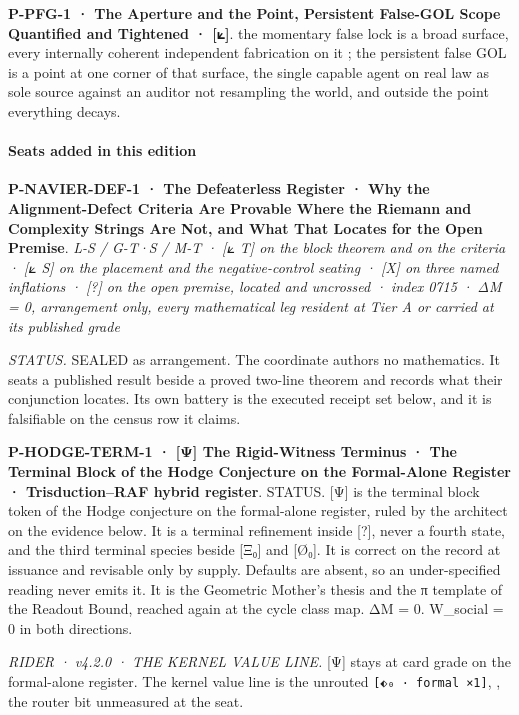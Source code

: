 \documentclass[10pt,twocolumn]{article}
\begin{document}
\textbf{P-PFG-1 · The Aperture and the Point, Persistent False-GOL Scope
Quantified and Tightened · {[}⟀{]}}. the momentary false lock is a broad
surface, every internally coherent independent fabrication on it ; the
persistent false GOL is a point at one corner of that surface, the
single capable agent on real law as sole source against an auditor not
resampling the world, and outside the point everything decays.

\hypertarget{seats-added-in-this-edition-2}{%
\paragraph{Seats added in this
edition}\label{seats-added-in-this-edition-2}}

\textbf{P-NAVIER-DEF-1 · The Defeaterless Register · Why the
Alignment-Defect Criteria Are Provable Where the Riemann and Complexity
Strings Are Not, and What That Locates for the Open Premise}. \emph{L-S
/ G-T·S / M-T · {[}⟀ T{]} on the block theorem and on the criteria ·
{[}⟀ S{]} on the placement and the negative-control seating · {[}X{]} on
three named inflations · {[}?{]} on the open premise, located and
uncrossed · index 0715 · ΔM = 0, arrangement only, every mathematical
leg resident at Tier A or carried at its published grade}

\emph{STATUS.} SEALED as arrangement. The coordinate authors no
mathematics. It seats a published result beside a proved two-line
theorem and records what their conjunction locates. Its own battery is
the executed receipt set below, and it is falsifiable on the census row
it claims.

\textbf{P-HODGE-TERM-1 · {[}Ψ{]} The Rigid-Witness Terminus · The
Terminal Block of the Hodge Conjecture on the Formal-Alone Register ·
Trisduction--RAF hybrid register}. STATUS. {[}Ψ{]} is the terminal block
token of the Hodge conjecture on the formal-alone register, ruled by the
architect on the evidence below. It is a terminal refinement inside
{[}?{]}, never a fourth state, and the third terminal species beside
{[}Ξ₀{]} and {[}Ø₀{]}. It is correct on the record at issuance and
revisable only by supply. Defaults are absent, so an under-specified
reading never emits it. It is the Geometric Mother's thesis and the π
template of the Readout Bound, reached again at the cycle class map. ΔM
= 0. W\_social = 0 in both directions.

\emph{RIDER · v4.2.0 · THE KERNEL VALUE LINE.} {[}Ψ{]} stays at card
grade on the formal-alone register. The kernel value line is the
unrouted \texttt{{[}⬖₀\ ·\ formal\ ×1{]}},
\texttt{}, the router bit
unmeasured at the seat.
\end{document}
